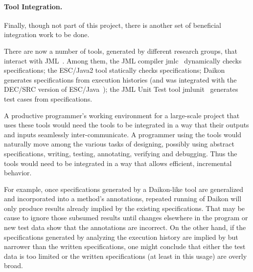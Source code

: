 \documentclass{acm_proc_article-sp}
\begin{document}
\paragraph*{Tool Integration.} Finally, though not part of this
project, there is another set of beneficial integration work to be
done.

There are now a number of tools, generated by different research
groups, that interact with JML~\cite{Burdy-etal03}.  Among them, the
JML compiler jmlc~\cite{Cheon-Leavens02b} dynamically checks
specifications; the ESC/Java2 tool statically checks specifications;
Daikon generates specifications from execution histories (and was
integrated with the DEC/SRC version of ESC/Java~\cite{NimmerErnst01});
the JML Unit Test tool jmlunit~\cite{Cheon-Leavens02} generates test
cases from specifications.
 
A productive programmer's working environment for a large-scale
project that uses these tools would need the tools to be integrated in
a way that their outputs and inputs seamlessly inter-communicate.  A
programmer using the tools would naturally move among the various
tasks of designing, possibly using abstract specifications, writing,
testing, annotating, verifying and debugging.  Thus the tools would
need to be integrated in a way that allows efficient, incremental
behavior.

For example, once specifications generated by a Daikon-like tool are
generalized and incorporated into a method's annotations, repeated
running of Daikon will only produce results already implied by the
existing specifications.  That may be cause to ignore those subsumed
results until changes elsewhere in the program or new test data show
that the annotations are incorrect.  On the other hand, if the
specifications generated by analyzing the execution history are
implied by but narrower than the written specifications, one might
conclude that either the test data is too limited or the written
specifications (at least in this usage) are overly broad.


\end{document}

